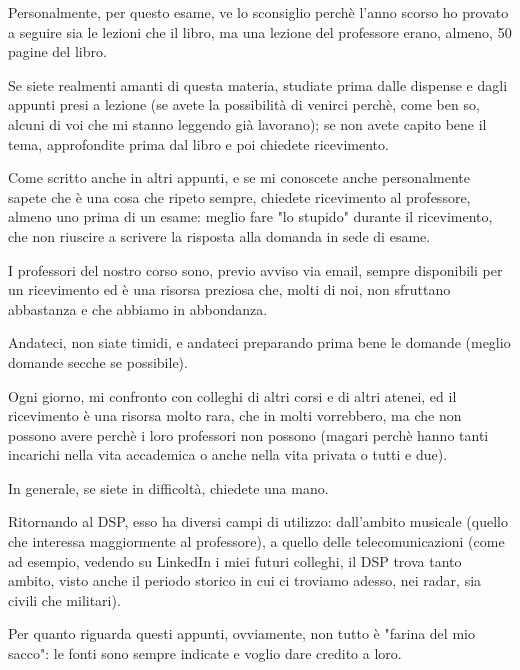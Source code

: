 Personalmente, per questo esame, ve lo sconsiglio perchè l'anno scorso ho provato a seguire sia le lezioni che il libro, ma una lezione del professore erano, almeno, 50 pagine del libro. \newline 

Se siete realmenti amanti di questa materia, studiate prima dalle dispense e dagli appunti presi a lezione (se avete la possibilità di venirci perchè, come ben so, alcuni di voi che mi stanno leggendo già lavorano); 
se non avete capito bene il tema, approfondite prima dal libro e poi chiedete ricevimento. \newline 

Come scritto anche in altri appunti, e se mi conoscete anche personalmente sapete che è una cosa che ripeto sempre, chiedete ricevimento al professore, almeno uno prima di un esame: 
meglio fare "lo stupido" durante il ricevimento, che non riuscire a scrivere la risposta alla domanda in sede di esame. \newline 

I professori del nostro corso sono, previo avviso via email, sempre disponibili per un ricevimento ed è una risorsa preziosa che, molti di noi, non sfruttano abbastanza e che abbiamo in abbondanza. \newline 

Andateci, non siate timidi, e andateci preparando prima bene le domande (meglio domande secche se possibile). \newline 

Ogni giorno, mi confronto con colleghi di altri corsi e di altri atenei, ed il ricevimento è una risorsa molto rara, che in molti vorrebbero, ma che non possono avere perchè i loro professori non possono (magari perchè hanno tanti incarichi nella vita accademica o anche nella vita privata o tutti e due). \newline 

In generale, se siete in difficoltà, chiedete una mano. \newline 

Ritornando al DSP, esso ha diversi campi di utilizzo: dall'ambito musicale (quello che interessa maggiormente al professore), a quello delle telecomunicazioni (come ad esempio, vedendo su LinkedIn i miei futuri colleghi, il DSP trova tanto ambito, visto anche il periodo storico in cui ci troviamo adesso, 
nei radar, sia civili che militari). \newline 

Per quanto riguarda questi appunti, ovviamente, non tutto è "farina del mio sacco": le fonti sono sempre indicate e voglio dare credito a loro. \newline 


